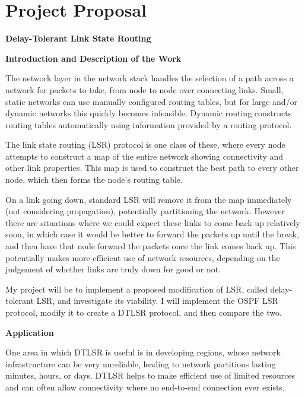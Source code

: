 \documentclass[withindex,glossary,openany]{cam-thesis}
\begin{document}


\appendix
{}

\chapter{Project Proposal}

\vspace{-8mm}
\Huge\textbf{Delay-Tolerant Link State Routing}

\vspace{8mm}
\LARGE\textbf{Introduction and Description of the Work}\normalsize

The network layer in the network stack handles the selection of a path across a network for packets to take, from node to node over connecting links. Small, static networks can use manually configured routing tables, but for large and/or dynamic networks this quickly becomes infeasible. Dynamic routing constructs routing tables automatically using information provided by a routing protocol.

The link state routing (LSR) protocol is one class of these, where every node attempts to construct a map of the entire network showing connectivity and other link properties. This map is used to construct the best path to every other node, which then forms the node’s routing table.

On a link going down, standard LSR will remove it from the map immediately (not considering propagation), potentially partitioning the network. However there are situations where we could expect these links to come back up relatively soon, in which case it would be better to forward the packets up until the break, and then have that node forward the packets once the link comes back up. This potentially makes more efficient use of network resources, depending on the judgement of whether links are truly down for good or not.

My project will be to implement a proposed modification of LSR, called delay-tolerant LSR, and investigate its viability. I will implement the OSPF LSR protocol, modify it to create a DTLSR protocol, and then compare the two.

\vspace{8mm}
\Large\textbf{Application}\normalsize

One area in which DTLSR is useful is in developing regions, whose network infrastructure can be very unreliable, leading to network partitions lasting minutes, hours, or days. DTLSR helps to make efficient use of limited resources and can often allow connectivity where no end-to-end connection ever exists.
\end{document}
